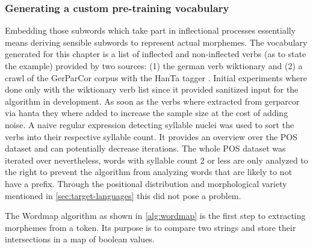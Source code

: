 \subsubsection{Generating a custom pre-training vocabulary}
\label{subsubsec:generating-a-custom-pre-training-vocabulary}

Embedding those subwords which take part in inflectional processes essentially means deriving sensible subwords to represent actual morphemes.
The vocabulary generated for this chapter is a list of inflected and non-inflected verbs (as to state the example) provided by two sources: (1) the german verb wiktionary and (2) a crawl of the GerParCor corpus with the HanTa tagger \cite{hanta}.
Initial experiments where done only with the wiktionary verb list since it provided sanitized input for the algorithm in development.
As soon as the verbs where extracted from \ac{gerparcor} via \ac{hanta} they where added to increase the sample size at the cost of adding noise.
A naive regular expression detecting syllable nuclei was used to sort the verbs into their respective syllable count.
It provides an overview over the POS dataset and can potentially decrease iterations.
The whole POS dataset was iterated over nevertheless, words with syllable count 2 or less are only analyzed to the right to prevent the algorithm from analyzing words that are likely to not have a prefix.
Through the positional distribution and morphological variety mentioned in \autoref{sec:target-languages} this did not pose a problem.

The Wordmap algorithm as shown in \autoref{alg:wordmap} is the first step to extracting morphemes from a token.
Its purpose is to compare two strings and store their intersections in a map of boolean values.


